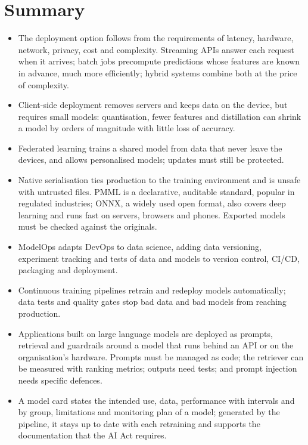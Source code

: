 \section{Summary}\label{sec:summary5}

\begin{itemize}
  \item The deployment option follows from the requirements of latency, hardware, network, privacy, cost and
        complexity. Streaming APIs answer each request when it arrives; batch jobs precompute predictions
        whose features are known in advance, much more efficiently; hybrid systems combine both at the price
        of complexity.
  \item Client-side deployment removes servers and keeps data on the device, but requires small models:
        quantisation, fewer features and distillation can shrink a model by orders of magnitude with little
        loss of accuracy.
  \item Federated learning trains a shared model from data that never leave the devices, and allows
        personalised models; updates must still be protected.
  \item Native serialisation ties production to the training environment and is unsafe with untrusted
        files. PMML is a declarative, auditable standard, popular in regulated industries; ONNX, a widely used open format, also covers deep learning and runs fast on servers, browsers and phones.
        Exported models must be checked against the originals.
  \item ModelOps adapts DevOps to data science, adding data versioning, experiment tracking and tests of data
        and models to version control, CI/CD, packaging and deployment.
  \item Continuous training pipelines retrain and redeploy models automatically; data tests and quality gates
        stop bad data and bad models from reaching production.
  \item Applications built on large language models are deployed as prompts, retrieval and guardrails around a
        model that runs behind an API or on the organisation's hardware. Prompts must be managed as code; the retriever can be
        measured with ranking metrics; outputs need tests; and prompt injection needs specific defences.
\item A model card states the intended use, data, performance with intervals and by group,
limitations and monitoring plan of a model; generated by the pipeline, it stays up to date with
each retraining and supports the documentation that the AI Act requires.
\end{itemize}

